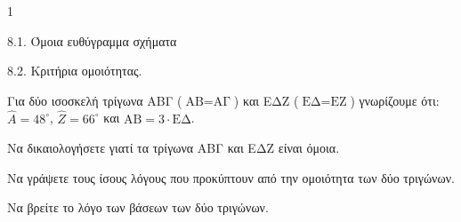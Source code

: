 \begin{ylh}{1}
    \item 8.1. Όμοια ευθύγραμμα σχήματα
    \item 8.2. Κριτήρια ομοιότητας.
\end{ylh}
Για δύο ισοσκελή τρίγωνα ΑΒΓ ($\text{AB} = \text{ΑΓ}$) και ΕΔΖ ($\text{ΕΔ} = \text{ΕΖ}$) γνωρίζουμε ότι:
$\hat{A} = 48^\circ$, $\hat{Z} = 66^\circ$ και $\text{AB} = 3 \cdot \text{ΕΔ}$.

\begin{alist}
    \item Να δικαιολογήσετε γιατί τα τρίγωνα ΑΒΓ και ΕΔΖ είναι όμοια. 
    \item
    \begin{rlist}
        \item Να γράψετε τους ίσους λόγους που προκύπτουν από την ομοιότητα των δύο τριγώνων.
        \item Να βρείτε το λόγο των βάσεων των δύο τριγώνων. 
    \end{rlist}
\end{alist}